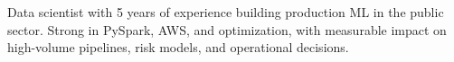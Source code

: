 Data scientist with 5 years of experience building production ML in the public sector. Strong in PySpark, AWS, and optimization, with measurable impact on high-volume pipelines, risk models, and operational decisions.